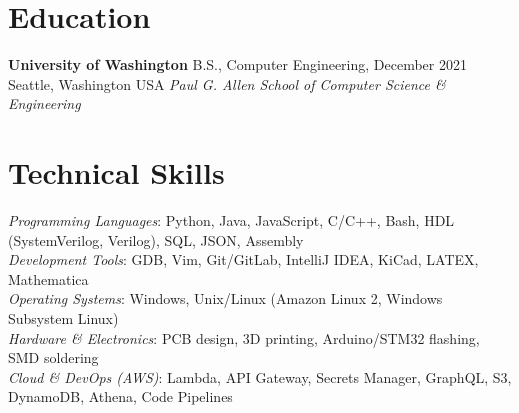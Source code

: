 \documentclass[margin,line]{res}
\newenvironment{list1}{
  \begin{list}{\ding{113}}{%
      \setlength{\itemsep}{0in}
      \setlength{\parsep}{0in} \setlength{\parskip}{0in}
      \setlength{\topsep}{0in} \setlength{\partopsep}{0in} 
      \setlength{\leftmargin}{0.17in}}}{\end{list}}
\begin{document}
\begin{resume}

%
%
\section{\sc Education}

{\bf University of Washington} \hfill B.S., Computer Engineering, December 2021 \\
Seattle, Washington USA \hfill {\em Paul G. Allen School of Computer Science \& Engineering} \\



\section{\sc Technical Skills} 
    {\em Programming Languages}:  
    Python, Java, JavaScript, C/C++, Bash, HDL (SystemVerilog, Verilog), SQL, JSON, Assembly
    \\
    {\em Development Tools}:  
    GDB, Vim, Git/GitLab, IntelliJ IDEA, KiCad, LATEX, Mathematica
    \\
    {\em Operating Systems}:  
    Windows, Unix/Linux (Amazon Linux 2, Windows Subsystem Linux)
    \\
    {\em Hardware \& Electronics}:  
    PCB design, 3D printing, Arduino/STM32 flashing, SMD soldering
    \\
    {\em Cloud \& DevOps (AWS)}:  
    Lambda, API Gateway, Secrets Manager, GraphQL, S3, DynamoDB, Athena, Code Pipelines


\end{resume}
\end{document}
